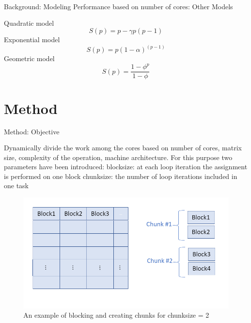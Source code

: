 \documentclass[10pt]{beamer}
\begin{document}
\begin{frame}{Background: Modeling Performance based on number of cores: Other Models}
	\begin{outline}
		\1Quadratic model
		$$ S(p) = p-\gamma{p(p-1)}$$
		\1Exponential model
		$$S(p) = p(1-\alpha)^{(p-1)}$$
		\1Geometric model
		$$S(p) = \frac{1-\phi^{p}}{1-\phi}$$
	\end{outline}
\end{frame}



\section{Method}
\begin{frame}{Method: Objective}
	\begin{outline}
		Dynamically divide the work among the cores based on number of cores, matrix size, complexity of the operation, machine architecture.
		For this purpose two parameters have been introduced:
		\1block\textunderscore size: at each loop iteration the assignment is performed on one block
		\1chunk\textunderscore size: the number of loop iterations included in one task 
		\begin{figure}
			\centering
			\includegraphics[width=0.72\linewidth]{images/chunks.png}
			\caption{An example of blocking and creating chunks for chunk\textunderscore size = 2}	
		\end{figure}	
	\end{outline}
\end{frame}
\end{document}
